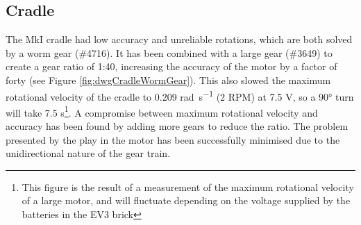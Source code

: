 \documentclass{report}
\newcommand{\legopiece}[1]{(\##1)}
\begin{document}
	\subsection{Cradle}

	The MkI cradle had low accuracy and unreliable rotations, which are both solved by a worm gear \legopiece{4716}. It has been combined with a large gear \legopiece{3649} to create a gear ratio of 1:40, increasing the accuracy of the motor by a factor of forty (see Figure \ref{fig:dwgCradleWormGear}). This also slowed the maximum rotational velocity of the cradle to 0.209 \si{\radian\per\second} (2 RPM) at 7.5 \si{\volt}, so a \ang{90} turn will take 7.5 \si{\second}\footnote{This figure is the result of a measurement of the maximum rotational velocity of a large motor, and will fluctuate depending on the voltage supplied by the batteries in the EV3 brick}. A compromise between maximum rotational velocity and accuracy has been found by adding more gears to reduce the ratio. The problem presented by the play in the motor has been successfully minimised due to the unidirectional nature of the gear train.
	
\end{document}
